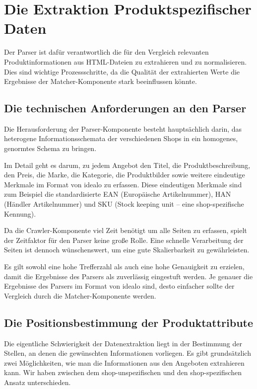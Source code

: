 \section{Die Extraktion Produktspezifischer Daten}
\label{sec:extraktion-produktspezifischer-daten}

Der Parser ist dafür verantwortlich die für den Vergleich relevanten Produktinformationen aus HTML-Dateien zu
extrahieren und zu normalisieren.
Dies sind wichtige Prozessschritte, da die Qualität der extrahierten Werte die Ergebnisse der Matcher-Komponente
stark beeinflussen könnte.

\subsection{Die technischen Anforderungen an den Parser}
\label{subsec:technische-anforderungen-parser}

Die Herausforderung der Parser-Komponente besteht hauptsächlich darin, das heterogene Informationsschemata der
verschiedenen Shops in ein homogenes, genormtes Schema zu bringen.

Im Detail geht es darum, zu jedem Angebot den Titel, die Produktbeschreibung, den Preis, die Marke, die Kategorie,
die Produktbilder sowie weitere eindeutige Merkmale im Format von idealo zu erfassen.
Diese eindeutigen Merkmale sind zum Beispiel die standardisierte EAN (Europäische Artikelnummer), HAN (Händler
Artikelnummer) und SKU (Stock keeping unit -- eine shop-spezifische Kennung).

Da die Crawler-Komponente viel Zeit benötigt um alle Seiten zu erfassen, spielt der Zeitfaktor für den Parser
keine große Rolle.
Eine schnelle Verarbeitung der Seiten ist dennoch wünschenswert, um eine gute Skalierbarkeit zu gewährleisten.

Es gilt sowohl eine hohe Trefferzahl als auch eine hohe Genauigkeit zu erzielen, damit die  Ergebnisse des Parsers
als zuverlässig eingestuft werden.
Je genauer die Ergebnisse des Parsers im Format von idealo sind, desto einfacher sollte der Vergleich durch die
Matcher-Komponente werden.

\subsection{Die Positionsbestimmung der Produktattribute}
\label{subsec:herangehensweisen}

Die eigentliche Schwierigkeit der Datenextraktion liegt in der Bestimmung der Stellen, an denen die gewünschten
Informationen vorliegen.
Es gibt grundsätzlich zwei Möglichkeiten, wie man die Informationen aus den Angeboten extrahieren kann.
Wir haben zwischen dem shop-unspezifischen und den shop-spezifischen Ansatz unterschieden.

